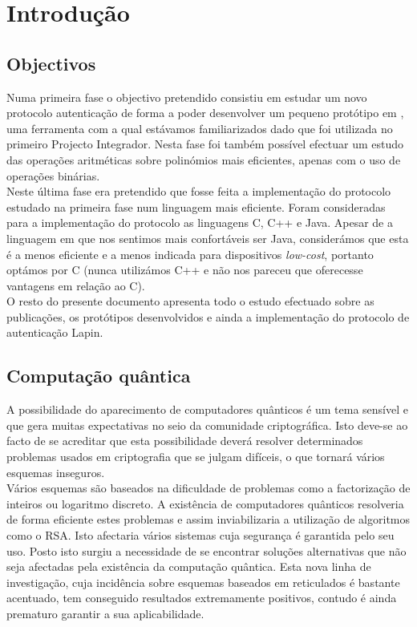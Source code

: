 \chapter{Introdução}
\section{Objectivos}
Numa primeira fase o objectivo pretendido consistiu em estudar um novo protocolo autenticação de forma a poder desenvolver um pequeno protótipo  em \sage, uma ferramenta com a qual estávamos familiarizados dado que foi utilizada no primeiro Projecto Integrador. Nesta fase foi também possível efectuar um estudo das operações aritméticas sobre polinómios mais eficientes, apenas com o uso de operações binárias.\\
Neste última fase era pretendido que fosse feita a implementação do protocolo estudado na primeira fase num linguagem mais eficiente. Foram consideradas para a implementação do protocolo as linguagens \textsf{C}, \textsf{C++} e \textsf{Java}. Apesar de a linguagem em que nos sentimos mais confortáveis ser \textsf{Java}, considerámos que esta é a menos eficiente e a menos indicada para dispositivos \textit{low-cost}, portanto optámos por \textsf{C} (nunca utilizámos \textsf{C++} e não nos pareceu que oferecesse vantagens em relação ao \textsf{C}).\\
O resto do presente documento apresenta todo o estudo efectuado sobre as publicações, os protótipos desenvolvidos e ainda a implementação do protocolo de autenticação Lapin.\\
\section{Computação quântica}
A possibilidade do aparecimento de computadores quânticos é um tema sensível e que gera muitas expectativas no seio da comunidade criptográfica. Isto deve-se ao facto de se acreditar que esta possibilidade deverá resolver determinados problemas usados em criptografia que se julgam difíceis, o que tornará vários esquemas inseguros.\\
Vários esquemas são baseados na dificuldade de problemas como a factorização de inteiros ou logaritmo discreto. A existência de computadores quânticos resolveria de forma eficiente estes problemas e assim inviabilizaria a utilização de algoritmos como o \textsf{RSA}. Isto afectaria vários sistemas cuja segurança é garantida pelo seu uso. Posto isto surgiu a necessidade de se encontrar soluções alternativas que não seja afectadas pela existência da computação quântica. Esta nova linha de investigação, cuja incidência sobre esquemas baseados em reticulados é bastante acentuado, tem conseguido resultados extremamente positivos, contudo é ainda prematuro garantir a sua aplicabilidade.
